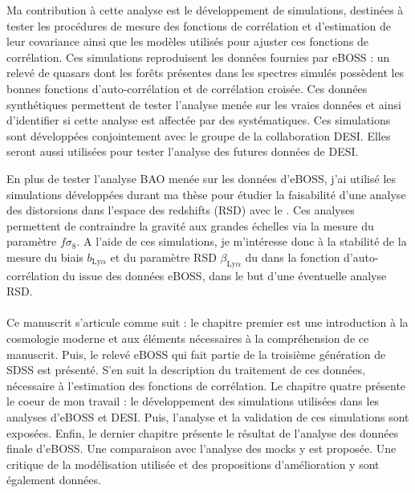 Ma contribution à cette analyse est le développement de simulations, destinées à tester les procédures de mesure des fonctions de corrélation et d'estimation de leur covariance ainsi que les modèles utilisés pour ajuster ces fonctions de corrélation.
Ces simulations reproduisent les données fournies par eBOSS : un relevé de quasars dont les forêts \lya{} présentes dans les spectres simulés possèdent les bonnes fonctions d'auto-corrélation et de corrélation croisée.
Ces données synthétiques permettent de tester l'analyse menée sur les vraies données et ainsi d'identifier si cette analyse est affectée par des systématiques.
Ces simulations sont développées conjointement avec le groupe \lya{} de la collaboration DESI. Elles seront aussi utilisées pour tester l'analyse des futures données de DESI.

En plus de tester l'analyse BAO menée sur les données d'eBOSS, j'ai utilisé les simulations développées durant ma thèse pour étudier la faisabilité d'une analyse des distorsions dans l'espace des redshifts (RSD) avec le \lya{}. Ces analyses permettent de contraindre la gravité aux grandes échelles via la mesure du paramètre $f \sigma_8$. A l'aide de ces simulations, je m'intéresse donc à la stabilité de la mesure du biais $b_{\mathrm{Ly}\alpha}$ et du paramètre RSD $\beta_{\mathrm{Ly}\alpha}$ du \lya{} dans la fonction d'auto-corrélation du \lya{} issue des données eBOSS, dans le but d'une éventuelle analyse RSD.

\paragraph{}
Ce manuscrit s'articule comme suit : le chapitre premier est une introduction à la cosmologie moderne et aux éléments nécessaires à la compréhension de ce manuscrit.
Puis, le relevé eBOSS  qui fait partie de la troisième génération de SDSS est présenté.
S'en suit la description du traitement de ces données, nécessaire à l'estimation des fonctions de corrélation.
Le chapitre quatre présente le coeur de mon travail : le développement des simulations utilisées dans les analyses \lya{} d'eBOSS et DESI.
Puis, l'analyse et la validation de ces simulations sont exposées.
Enfin, le dernier chapitre présente le résultat de l'analyse des données finale d'eBOSS. Une comparaison avec l'analyse des mocks y est proposée.
Une critique de la modélisation utilisée et des propositions d'amélioration y sont également données.

% 
